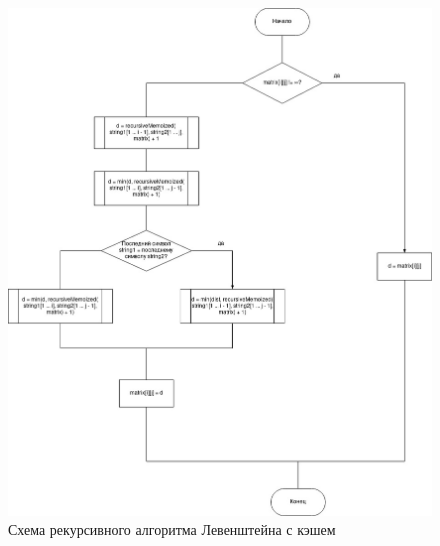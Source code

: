 \documentclass[12pt]{report}
\begin{document}
	\begin{figure}[h]
		\centering
		\includegraphics[scale=0.35]{mem.jpg}
		\caption{Схема рекурсивного алгоритма Левенштейна с кэшем}
		\label{fig:mpr}
	\end{figure}
\end{document}

